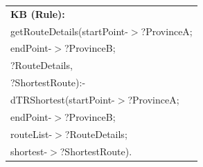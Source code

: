 \documentclass[a4paper,9pt]{beamer}
\begin{document}
{\begin{columns}[c]
\begin{figure} [tbph]
\centering
\footnotesize
\begin{tabular}{|l|}
\hline
\textbf{\color{blue}KB (Rule):}\\ 
getRouteDetails(startPoint-$>$?ProvinceA; \\
\hspace{0.66in}  endPoint-$>$?ProvinceB; \\
\hspace{0.66in}  {\color{red}?RouteDetails}, \\
\hspace{0.66in}  {\color{red}?ShortestRoute)}:-\\
\hspace{0.1in}dTRShortest(startPoint-$>$?ProvinceA; \\
  \hspace{0.67in}          endPoint-$>$?ProvinceB; \\
   \hspace{0.67in}         routeList-$>$?RouteDetails; \\
   \hspace{0.67in}         shortest-$>$?ShortestRoute).\\
 \hline
 \end{tabular}
\end{figure} 
 \end{columns}
}
\end{document}
